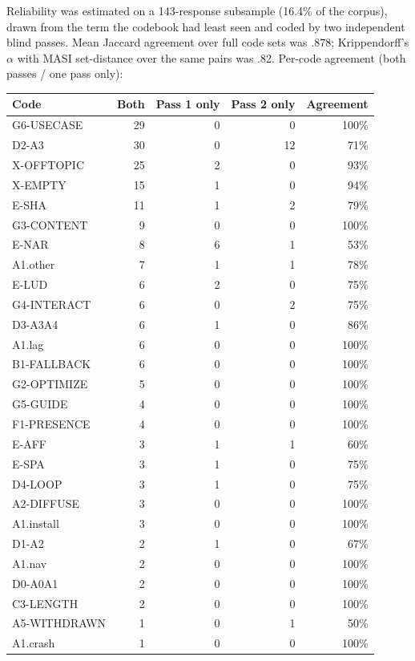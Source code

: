 Reliability was estimated on a 143-response subsample (16.4\% of the corpus),
drawn from the term the codebook had least seen and coded by two independent
blind passes. Mean Jaccard agreement over full code sets was .878;
Krippendorff's $\alpha$ with MASI set-distance over the same pairs was .82.
Per-code agreement (both passes / one pass only):

\begin{center}
\begin{tabular}{lrrrr}
\hline
Code & Both & Pass 1 only & Pass 2 only & Agreement \\
\hline
G6-USECASE & 29 & 0 & 0 & 100\% \\
D2-A3 & 30 & 0 & 12 & 71\% \\
X-OFFTOPIC & 25 & 2 & 0 & 93\% \\
X-EMPTY & 15 & 1 & 0 & 94\% \\
E-SHA & 11 & 1 & 2 & 79\% \\
G3-CONTENT & 9 & 0 & 0 & 100\% \\
E-NAR & 8 & 6 & 1 & 53\% \\
A1.other & 7 & 1 & 1 & 78\% \\
E-LUD & 6 & 2 & 0 & 75\% \\
G4-INTERACT & 6 & 0 & 2 & 75\% \\
D3-A3A4 & 6 & 1 & 0 & 86\% \\
A1.lag & 6 & 0 & 0 & 100\% \\
B1-FALLBACK & 6 & 0 & 0 & 100\% \\
G2-OPTIMIZE & 5 & 0 & 0 & 100\% \\
G5-GUIDE & 4 & 0 & 0 & 100\% \\
F1-PRESENCE & 4 & 0 & 0 & 100\% \\
E-AFF & 3 & 1 & 1 & 60\% \\
E-SPA & 3 & 1 & 0 & 75\% \\
D4-LOOP & 3 & 1 & 0 & 75\% \\
A2-DIFFUSE & 3 & 0 & 0 & 100\% \\
A1.install & 3 & 0 & 0 & 100\% \\
D1-A2 & 2 & 1 & 0 & 67\% \\
A1.nav & 2 & 0 & 0 & 100\% \\
D0-A0A1 & 2 & 0 & 0 & 100\% \\
C3-LENGTH & 2 & 0 & 0 & 100\% \\
A5-WITHDRAWN & 1 & 0 & 1 & 50\% \\
A1.crash & 1 & 0 & 0 & 100\% \\
\hline
\end{tabular}
\end{center}

